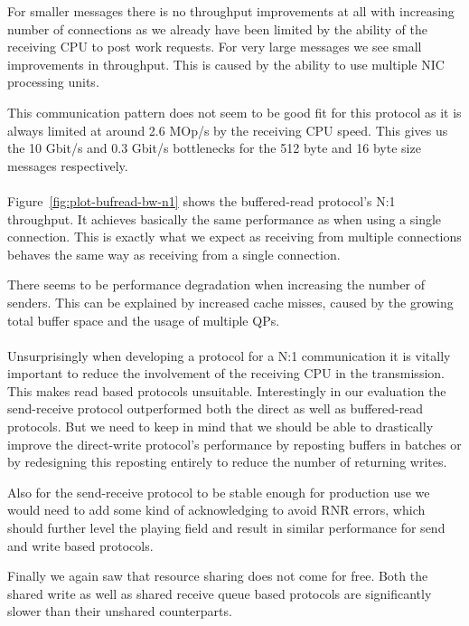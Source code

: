 For smaller messages there is no throughput improvements at all with increasing number of connections as we already have 
been limited by the ability of the receiving CPU to post work requests. For very large messages we see small improvements
in throughput. This is caused by the ability to use multiple NIC processing units.

This communication pattern does not seem to be good fit for this protocol as it is always limited at around 
2.6 MOp/s by the receiving CPU speed. This gives us the 10 Gbit/s and 0.3 Gbit/s bottlenecks for the 512 byte and
16 byte size messages respectively.

\paragraph{} Figure~\ref{fig:plot-bufread-bw-n1} shows the buffered-read protocol's N:1 throughput. It 
achieves basically the 
same performance as when using a single connection. This is exactly what we expect as receiving from multiple connections
behaves the same way as receiving from a single connection.

There seems to be performance degradation when increasing the number of senders. This can  be explained
by increased cache misses, caused by the growing total buffer space and the usage of multiple QPs.


\paragraph{} Unsurprisingly when developing a protocol for a N:1 communication it is vitally important to reduce the 
involvement of the receiving CPU in the transmission. This makes read based protocols unsuitable. Interestingly in our
evaluation the send-receive protocol outperformed both the direct as well as buffered-read protocols. But we need to 
keep in mind that we should be able to drastically improve the direct-write protocol's performance by reposting
buffers in batches or by redesigning this reposting entirely to reduce the number of returning writes.

Also for the send-receive protocol to be stable enough for production use we would need to add some kind of acknowledging to
avoid RNR errors, which should further level the playing field and result in similar performance for send and write based 
protocols.

Finally we again saw that resource sharing does not come for free. Both the shared write as well as shared receive queue based
protocols are significantly slower than their unshared counterparts. 








